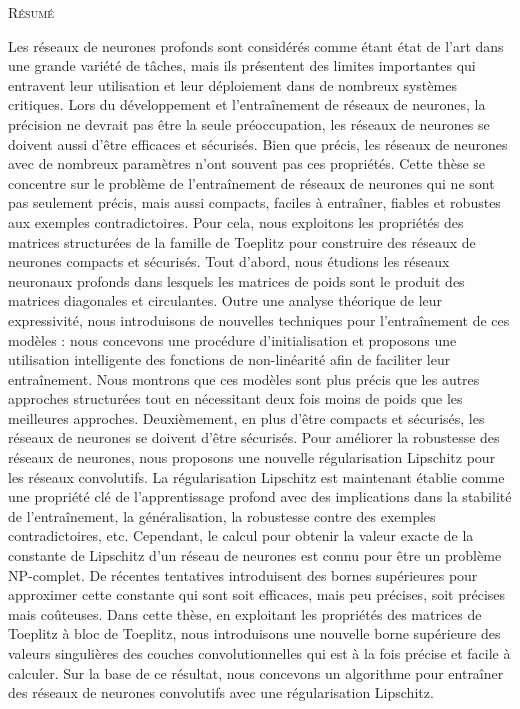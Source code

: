 \begin{center}
  {\Huge \textsc{Résumé}}
\end{center}
%
\noindent
%

Les réseaux de neurones profonds sont considérés comme étant état de l'art dans une grande variété de tâches, mais ils présentent des limites importantes qui entravent leur utilisation et leur déploiement dans de nombreux systèmes critiques.
Lors du développement et l'entraînement de réseaux de neurones, la précision ne devrait pas être la seule préoccupation, les réseaux de neurones se doivent aussi d'être efficaces et sécurisés.
Bien que précis, les réseaux de neurones avec de nombreux paramètres n'ont souvent pas ces propriétés.
Cette thèse se concentre sur le problème de l'entraînement de réseaux de neurones qui ne sont pas seulement précis, mais aussi compacts, faciles à entraîner, fiables et robustes aux exemples contradictoires.
Pour cela, nous exploitons les propriétés des matrices structurées de la famille de Toeplitz pour construire des réseaux de neurones compacts et sécurisés.
Tout d'abord, nous étudions les réseaux neuronaux profonds dans lesquels les matrices de poids sont le produit des matrices diagonales et circulantes.
Outre une analyse théorique de leur expressivité, nous introduisons de nouvelles techniques pour l'entraînement de ces modèles : nous concevons une procédure d'initialisation et proposons une utilisation intelligente des fonctions de non-linéarité afin de faciliter leur entraînement.
Nous montrons que ces modèles sont plus précis que les autres approches structurées tout en nécessitant deux fois moins de poids que les meilleures approches.
Deuxièmement, en plus d'être compacts et sécurisés, les réseaux de neurones se doivent d'être sécurisés.
Pour améliorer la robustesse des réseaux de neurones, nous proposons une nouvelle régularisation Lipschitz pour les réseaux convolutifs.
La régularisation Lipschitz est maintenant établie comme une propriété clé de l'apprentissage profond avec des implications dans la stabilité de l'entraînement, la généralisation, la robustesse contre des exemples contradictoires, etc.
Cependant, le calcul pour obtenir la valeur exacte de la constante de Lipschitz d'un réseau de neurones est connu pour être un problème NP-complet.
De récentes tentatives introduisent des bornes supérieures pour approximer cette constante qui sont soit efficaces, mais peu précises, soit précises mais coûteuses.
Dans cette thèse, en exploitant les propriétés des matrices de Toeplitz à bloc de Toeplitz, nous introduisons une nouvelle borne supérieure des valeurs singulières des couches convolutionnelles qui est à la fois précise et facile à calculer.
Sur la base de ce résultat, nous concevons un algorithme pour entraîner des réseaux de neurones convolutifs avec une régularisation Lipschitz.


\newpage
\null
\thispagestyle{empty}
\newpage
